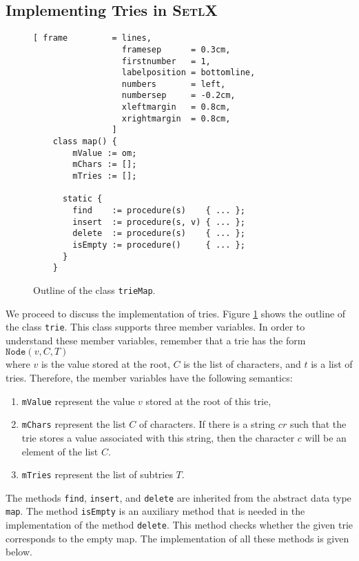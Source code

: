 \subsection{Implementing Tries in \textsc{SetlX}}
\begin{figure}[!ht]
\centering
\begin{Verbatim}[ frame         = lines, 
                  framesep      = 0.3cm, 
                  firstnumber   = 1,
                  labelposition = bottomline,
                  numbers       = left,
                  numbersep     = -0.2cm,
                  xleftmargin   = 0.8cm,
                  xrightmargin  = 0.8cm,
                ]
    class map() {
        mValue := om;
        mChars := [];
        mTries := [];
    
      static {
        find    := procedure(s)    { ... };
        insert  := procedure(s, v) { ... };
        delete  := procedure(s)    { ... };
        isEmpty := procedure()     { ... };
      }
    }
\end{Verbatim}
\vspace*{-0.3cm}
\caption{Outline of the class \texttt{trieMap}.}
\label{fig:trie.stlx-outline}
\end{figure}

\noindent
We proceed to discuss the implementation of tries.  Figure \ref{fig:trie.stlx-outline} shows the
outline of the class \texttt{trie}.  This class supports three member variables.  In order to
understand these member variables, remember that a trie has the form
\\[0.2cm]
\hspace*{1.3cm}
$\texttt{Node}(v, C, T)$
\\[0.2cm]
where $v$ is the value stored at the root, $C$ is the list of characters, and $t$ is a list of
tries.  Therefore, the member variables have the following semantics:
\begin{enumerate}
\item \texttt{mValue} represent the value $v$ stored at the root of this trie,  
\item \texttt{mChars} represent the list  $C$ of characters.  If there is a string $cr$ such that
      the trie stores a value associated with this string, then the character $c$ will be an element of
      the list $C$.
\item \texttt{mTries} represent the list of subtries $T$.  
\end{enumerate}
The methods \texttt{find}, \texttt{insert}, and \texttt{delete} are inherited from the abstract data
type \texttt{map}.  The method \texttt{isEmpty} is an auxiliary method that is needed in the
implementation of the method \texttt{delete}.  This method checks whether the given trie corresponds
to the empty map.  The implementation of all these methods is given below.

